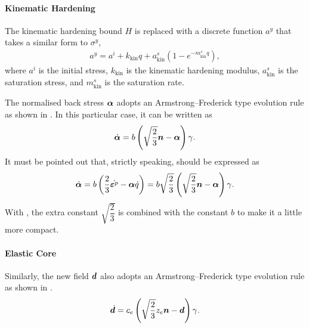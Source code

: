 \paragraph{Kinematic Hardening}
The kinematic hardening bound $H$ is replaced with a discrete function $a^y$ that takes a similar form to $\sigma^y$,
\begin{gather}\label{eq:kin_bone}
    a^y=a^i+k_\text{kin}q+a^s_\text{kin}\left(1-e^{-m^s_\text{kin}q}\right),
\end{gather}
where $a^i$ is the initial stress, $k_\text{kin}$ is the kinematic hardening modulus, $a^s_\text{kin}$ is the saturation stress, and $m^s_\text{kin}$ is the saturation rate.

The normalised back stress $\bm{\alpha}$ adopts an Armstrong--Frederick type \cite{Frederick2007} evolution rule as shown in .
In this particular case, it can be written as
\begin{gather}\label{eq:normalised_back_rule}
    \dot{\bm{\alpha}}=b\left(\sqrt{\dfrac{2}{3}}\bm{n}-\bm{\alpha}\right)\gamma.
\end{gather}
It must be pointed out that, strictly speaking,  should be expressed as \cite{Simo1998}
\begin{gather}
    \dot{\bm{\alpha}}=b\left(\dfrac{2}{3}\dot{\bm{\varepsilon}^p}-\bm{\alpha}\dot{q}\right)=b\sqrt{\dfrac{2}{3}}\left(\sqrt{\dfrac{2}{3}}\bm{n}-\bm{\alpha}\right)\gamma.
\end{gather}
With , the extra constant $\sqrt{\dfrac{2}{3}}$ is combined with the constant $b$ to make it a little more compact.
\paragraph{Elastic Core}
Similarly, the new field $\bm{d}$ also adopts an Armstrong--Frederick type evolution rule as shown in .
\begin{gather}
    \dot{\bm{d}}=c_e\left(\sqrt{\dfrac{2}{3}}z_e\bm{n}-\bm{d}\right)\gamma.
\end{gather}
